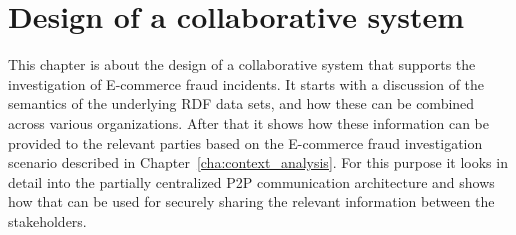 
\chapter{Design of a collaborative system} %
\label{cha:system_design}

This chapter is about the design of a collaborative system that supports the investigation of \gls{E-commerce} fraud incidents. It starts with a discussion of the semantics of the underlying \gls{RDF} data sets, and how these can be combined across various organizations. After that it shows how these information can be provided to the relevant parties based on the \gls{E-commerce} fraud investigation scenario described in Chapter~\ref{cha:context_analysis}. For this purpose it looks in detail into the partially centralized \gls{P2P} communication architecture and shows how that can be used for securely sharing the relevant information between the stakeholders.







